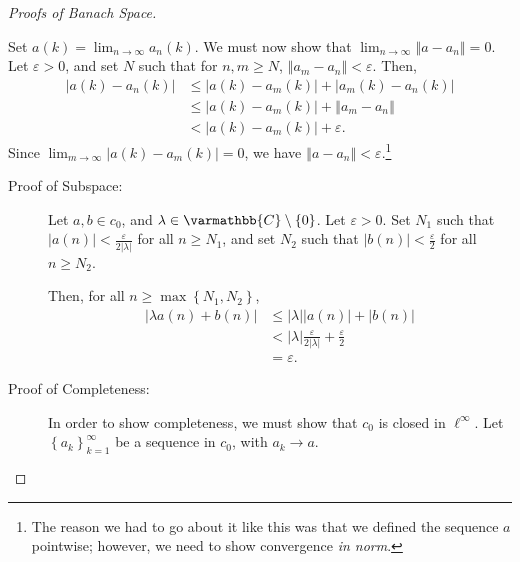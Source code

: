 \documentclass[12pt]{extarticle}
\newcommand{\C}{\mathbb{C}}
\newcommand{\norm}[1]{\left\Vert #1\right\Vert}
\newcommand{\set}[1]{\left\{#1\right\}}
\newcommand{\ve}{\varepsilon}
\theoremstyle{plain}
\theoremstyle{definition}
\theoremstyle{note}
\renewcommand*{\mathbb}[1]{\varmathbb{#1}}
\renewcommand{\newline}{\hfill\break}
\begin{document}
\begin{proof}[Proofs of Banach Space]
\begin{description}[font = \normalfont]
\begin{description}
          Set $a(k) = \lim_{n\rightarrow\infty}a_n(k)$. We must now show that $\lim_{n\rightarrow\infty}\norm{a - a_n} = 0$. Let $\ve > 0$, and set $N$ such that for $n,m\geq N$, $\norm{a_m - a_n} < \ve$. Then,
          \begin{align*}
            \left\vert a(k) - a_n(k) \right\vert &\leq \left\vert a(k) - a_m(k) \right\vert + \left\vert a_m(k) - a_n(k) \right\vert\\
                                                 &\leq \left\vert a(k) - a_m(k) \right\vert + \norm{a_m - a_n}\\
                                                 &< \left\vert a(k) - a_m(k) \right\vert + \ve.
          \end{align*}
          Since $\lim_{m\rightarrow\infty} \left\vert a(k) - a_m(k) \right\vert = 0$, we have $\norm{a - a_n} < \ve$.\footnote{The reason we had to go about it like this was that we defined the sequence $a$ pointwise; however, we need to show convergence \textit{in norm}.}
      \end{description}
    \item[$c_0$:]\hfill
      \begin{description}
        \item[Proof of Subspace:] Let $a,b\in c_0$, and $\lambda \in \C\setminus \set{0}$. Let $\ve > 0$. Set $N_1$ such that $|a(n)| < \frac{\ve}{2|\lambda|}$ for all $n\geq N_1$, and set $N_2$ such that $|b(n)| < \frac{\ve}{2}$ for all $n \geq N_2$.\newline

          Then, for all $n \geq \max\set{N_1,N_2}$,
          \begin{align*}
            |\lambda a(n) + b(n)| &\leq |\lambda||a(n)| + |b(n)|\\
                                  &< |\lambda|\frac{\ve}{2|\lambda|} + \frac{\ve}{2}\\
                                  &= \ve.
          \end{align*}
        \item[Proof of Completeness:] In order to show completeness, we must show that $c_0$ is closed in $\ell^{\infty}$. Let $\set{a_k}_{k=1}^{\infty}$ be a sequence in $c_0$, with $a_k \rightarrow a$.\newline


\end{description}
\end{description}
\end{proof}
\end{document}
